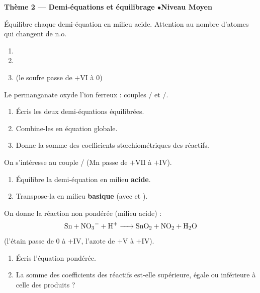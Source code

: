\documentclass[11pt,a4paper]{article}
\begin{document}
\begin{center}\color{primarydark}\large\bfseries Thème 2 — Demi-équations et équilibrage \quad$\bullet$\quad Niveau Moyen\end{center}

\begin{exo}
Équilibre chaque demi-équation en milieu acide. Attention au nombre d'atomes qui changent de n.o.
\begin{enumerate}[label=\alph*)]
  \item {}
  \item {}
  \item {} \quad (le soufre passe de $+\mathrm{VI}$ à $0$)
\end{enumerate}
\end{exo}

\begin{exo}
Le permanganate oxyde l'ion ferreux : couples / et /.
\begin{enumerate}[label=\alph*)]
  \item Écris les deux demi-équations équilibrées.
  \item Combine-les en équation globale.
  \item Donne la somme des coefficients stœchiométriques des réactifs.
\end{enumerate}
\end{exo}

\begin{exo}
On s'intéresse au couple / (Mn passe de $+\mathrm{VII}$ à $+\mathrm{IV}$).
\begin{enumerate}[label=\alph*)]
  \item Équilibre la demi-équation en milieu \textbf{acide}.
  \item Transpose-la en milieu \textbf{basique} (avec  et ).
\end{enumerate}
\end{exo}

\begin{exo}
On donne la réaction non pondérée (milieu acide) :
\[
\ce{Sn + NO3^- + H+ -> SnO2 + NO2 + H2O}
\]
(l'étain passe de $0$ à $+\mathrm{IV}$, l'azote de $+\mathrm{V}$ à $+\mathrm{IV}$).
\begin{enumerate}[label=\alph*)]
  \item Écris l'équation pondérée.
  \item La somme des coefficients des réactifs est-elle supérieure, égale ou inférieure à celle des
        produits ?
\end{enumerate}
\end{exo}
\end{document}
